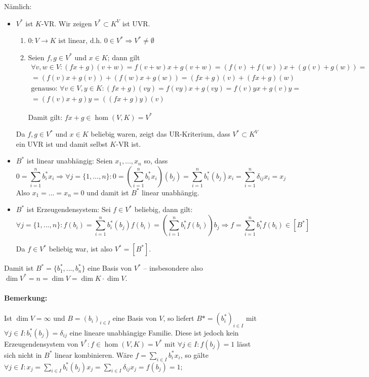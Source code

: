 	Nämlich:
	\begin{itemize}
	\item $ V^* $ ist $ K $-VR. Wir zeigen $ V^*\subset K^V $ ist UVR.
	\begin{enumerate}
		\item $ 0: V\to K $ ist linear, d.h. $ 0 \in V^* \Rightarrow V^* \neq \emptyset $
		\item Seien $ f,g \in V^* $ und $ x\in K $; dann gilt
			\begin{gather*}
				\forall v,w\in V: (fx+g)(v+w) = f(v+w)x+g(v+w)=(f(v)+ f(w))x+(g(v)+g(w))=\\
				=(f(v)x+g(v))+(f(w)x+g(w)) = (fx+g)(v)+(fx+g)(w)\\
				\text{genauso: } \forall v\in V, y\in K: (fx+g)(vy) = f(vy)x+g(vy) = f(v)yx + g(v)y =\\ =(f(v)x +g )y = ((fx+g)y)(v)
			\end{gather*}
			
			Damit gilt: $ fx+g\in \hom (V,K) = V^* $
	\end{enumerate}
	
	Da $ f,g\in V^* $ und $ x\in K $ beliebig waren, zeigt das UR-Kriterium, dass $ V^*\subset K^V $ ein UVR ist und damit selbst $ K $-VR ist.
	\item $ B^* $ ist linear unabhängig: Seien $ x_1,...,x_n $ so, dass
		\begin{equation*}
		0 = \sum_{i=1}^{n}b_i^*x_i \Rightarrow \forall j=\{1,...,n\}:0=(\sum_{i=1}^{n}b_i^*x_i)(b_j) = \sum_{i=1}^{n}b_i^*(b_j)x_i = \sum_{i=1}^{n}\delta_{ij}x_i = x_j
		\end{equation*}
	Also $ x_1 = ... = x_n = 0 $ und damit ist $ B^* $ linear unabhängig.
	\item $ B^* $ ist Erzeugendensystem: Sei $ f\in V^* $ beliebig, dann gilt:
	\begin{equation*}
		\forall j = \{1,...,n\}:f(b_i) = \sum_{i=1}^{n}b_i^*(b_j)f(b_i) = (\sum_{i=1}^{n}b_i^*f(b_i))b_j \Rightarrow f = \sum_{i=1}^{n}b_i^*f(b_i)\in [B^*]
	\end{equation*}
	
	Da $ f\in V^* $ beliebig war, ist also $ V^* = [B^*]$.
	\end{itemize}
	
	Damit ist $ B^* = \{b_1^*,...,b_n^*\}$ eine Basis von $ V^* $ -- insbesondere also $ \dim V^* = n = \dim V = \dim K\cdot \dim V $.
	
\paragraph{Bemerkung:}
	Ist $\dim V = \infty$ und $B=(b_i)_{i\in I}$ eine Basis von $V$, so liefert $B\ast=(b_i^\ast)_{i\in I}$ mit $\forall j\in I:b_i^\ast(b_j)=\delta_{ij}$ eine lineare unabhängige Familie. Diese ist jedoch kein Erzeugendensystem von $V^\ast: f\in\hom(V,K)=V^\ast$ mit $\forall j\in I:f(b_j)=1$ lässt sich nicht in $B^\ast$ linear kombinieren. Wäre $f=\sum_{i\in I}b_i^\ast x_i$, so gälte $\forall j\in I: x_j =\sum_{i\in I}b_i^\ast(b_j)x_j= \sum_{i\in I} \delta_{ij}x_j = f(b_j) = 1$; 


